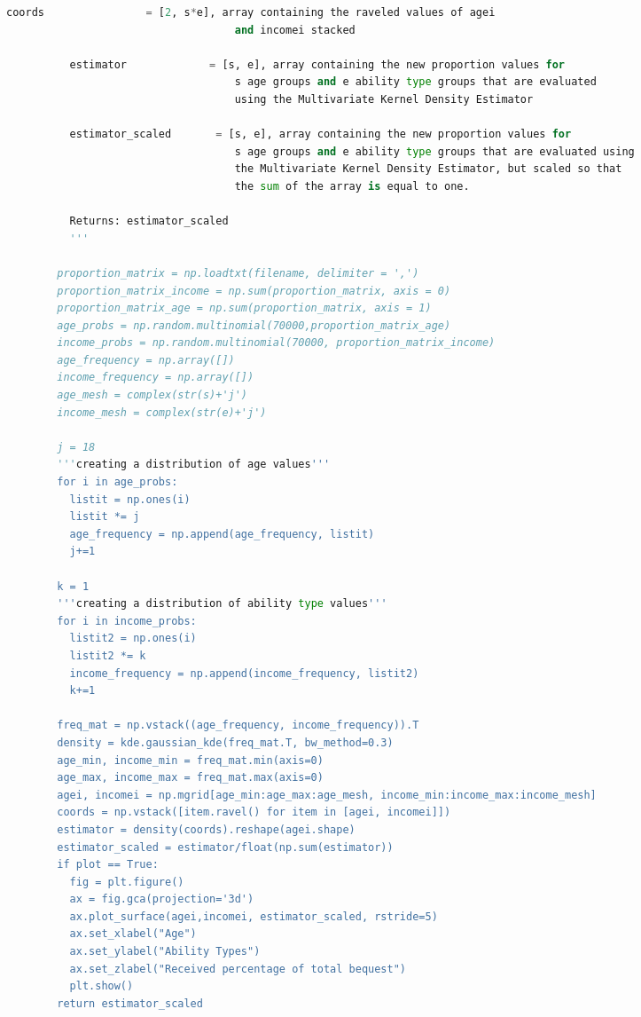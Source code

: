 \documentclass[letterpaper,12pt]{article}
\theoremstyle{definition}
\begin{document}
\begin{spacing}{1.5}
\begin{lstlisting}[language=Python, caption=MVKDE.py]
          coords                = [2, s*e], array containing the raveled values of agei
                                    and incomei stacked

          estimator             = [s, e], array containing the new proportion values for
                                    s age groups and e ability type groups that are evaluated
                                    using the Multivariate Kernel Density Estimator

          estimator_scaled       = [s, e], array containing the new proportion values for
                                    s age groups and e ability type groups that are evaluated using
                                    the Multivariate Kernel Density Estimator, but scaled so that
                                    the sum of the array is equal to one.

          Returns: estimator_scaled
          '''

        proportion_matrix = np.loadtxt(filename, delimiter = ',')
        proportion_matrix_income = np.sum(proportion_matrix, axis = 0)
        proportion_matrix_age = np.sum(proportion_matrix, axis = 1)
        age_probs = np.random.multinomial(70000,proportion_matrix_age)
        income_probs = np.random.multinomial(70000, proportion_matrix_income)
        age_frequency = np.array([])
        income_frequency = np.array([])
        age_mesh = complex(str(s)+'j')
        income_mesh = complex(str(e)+'j')

        j = 18
        '''creating a distribution of age values'''
        for i in age_probs:
          listit = np.ones(i)
          listit *= j
          age_frequency = np.append(age_frequency, listit)
          j+=1

        k = 1
        '''creating a distribution of ability type values'''
        for i in income_probs:
          listit2 = np.ones(i)
          listit2 *= k
          income_frequency = np.append(income_frequency, listit2)
          k+=1

        freq_mat = np.vstack((age_frequency, income_frequency)).T
        density = kde.gaussian_kde(freq_mat.T, bw_method=0.3)
        age_min, income_min = freq_mat.min(axis=0)
        age_max, income_max = freq_mat.max(axis=0)
        agei, incomei = np.mgrid[age_min:age_max:age_mesh, income_min:income_max:income_mesh]
        coords = np.vstack([item.ravel() for item in [agei, incomei]])
        estimator = density(coords).reshape(agei.shape)
        estimator_scaled = estimator/float(np.sum(estimator))
        if plot == True:
          fig = plt.figure()
          ax = fig.gca(projection='3d')
          ax.plot_surface(agei,incomei, estimator_scaled, rstride=5)
          ax.set_xlabel("Age")
          ax.set_ylabel("Ability Types")
          ax.set_zlabel("Received percentage of total bequest")
          plt.show()
        return estimator_scaled


\end{lstlisting}
\end{spacing}
\end{document}
